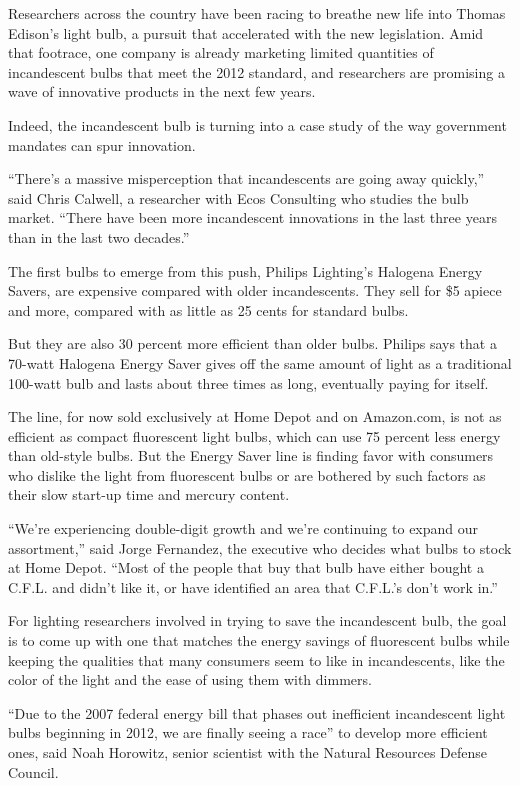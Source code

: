﻿\documentclass[12pt]{article}
\begin{document}
Researchers across the country have been racing to breathe new life into Thomas Edison's light bulb,
a pursuit that accelerated with the new legislation. Amid that footrace, one company is already
marketing limited quantities of incandescent bulbs that meet the 2012 standard, and researchers are
promising a wave of innovative products in the next few years.

Indeed, the incandescent bulb is turning into a case study of the way government mandates can spur
innovation.

``There's a massive misperception that incandescents are going away quickly,'' said Chris Calwell, a
researcher with Ecos Consulting who studies the bulb market. ``There have been more incandescent
innovations in the last three years than in the last two decades.''

The first bulbs to emerge from this push, Philips Lighting's Halogena Energy Savers, are expensive
compared with older incandescents. They sell for \$5 apiece and more, compared with as little as 25
cents for standard bulbs.

But they are also 30 percent more efficient than older bulbs. Philips says that a 70-watt Halogena
Energy Saver gives off the same amount of light as a traditional 100-watt bulb and lasts about three
times as long, eventually paying for itself.

The line, for now sold exclusively at Home Depot and on Amazon.com, is not as efficient as compact
fluorescent light bulbs, which can use 75 percent less energy than old-style bulbs. But the Energy
Saver line is finding favor with consumers who dislike the light from fluorescent bulbs or are
bothered by such factors as their slow start-up time and mercury content.

``We're experiencing double-digit growth and we're continuing to expand our assortment,'' said Jorge
Fernandez, the executive who decides what bulbs to stock at Home Depot. ``Most of the people that
buy that bulb have either bought a C.F.L. and didn't like it, or have identified an area that
C.F.L.'s don't work in.''

For lighting researchers involved in trying to save the incandescent bulb, the goal is to come up
with one that matches the energy savings of fluorescent bulbs while keeping the qualities that many
consumers seem to like in incandescents, like the color of the light and the ease of using them with
dimmers.

``Due to the 2007 federal energy bill that phases out inefficient incandescent light bulbs beginning
in 2012, we are finally seeing a race'' to develop more efficient ones, said Noah Horowitz, senior
scientist with the Natural Resources Defense Council.
\end{document}
